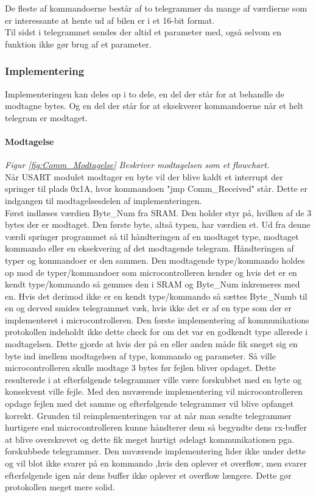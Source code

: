 De fleste af kommandoerne består af to telegrammer da mange af værdierne som er interessante at hente ud af bilen er i et 16-bit format.\\
Til sidst i telegrammet sendes der altid et parameter med, også selvom en funktion ikke gør brug af et parameter.

\subsubsection{Implementering}
Implementeringen kan deles op i to dele, en del der står for at behandle de modtagne bytes. Og en del der står for at eksekverer kommandoerne når et helt telegram er modtaget. 

\paragraph{Modtagelse}
\textit{Figur \ref{fig:Comm_Modtagelse} Beskriver modtagelsen som et flowchart.} \\

Når USART modulet modtager en byte vil der blive kaldt et interrupt der springer til plads 0x1A, hvor kommandoen "jmp Comm\_Received" står. Dette er indgangen til modtagelsesdelen af implementeringen. \\
Først indlæses værdien Byte\_Num fra SRAM. Den holder styr på, hvilken af de 3 bytes der er modtaget. Den første byte, altså typen, har værdien et. Ud fra denne værdi springer programmet så til håndteringen af en modtaget type, modtaget kommando eller en eksekvering af det modtagende telegram. Håndteringen af typer og kommandoer er den sammen. Den modtagende type/kommando holdes op mod de typer/kommandoer som microcontrolleren kender og hvis det er en kendt type/kommando så gemmes den i SRAM og Byte\_Num inkremeres med en. Hvis det derimod ikke er en kendt type/kommando så sættes Byte\_Numb til en og derved smides telegrammet væk, hvis ikke det er af en type som der er implementeret i microcontrolleren. Den første implementering af kommunikations protokollen indeholdt ikke dette check for om det var en godkendt type allerede i modtagelsen. Dette gjorde at hvis der på en eller anden måde fik sneget sig en byte ind imellem modtagelsen af type, kommando og parameter. Så ville microcontrolleren skulle modtage 3 bytes før fejlen bliver opdaget. Dette resulterede i at efterfølgende telegrammer ville være forskubbet med en byte og konsekvent ville fejle. Med den nuværende implementering vil microcontrolleren opdage fejlen med det samme og efterfølgende telegrammer vil blive opfanget korrekt. Grunden til reimplementeringen var at når man sendte telegrammer hurtigere end microcontrolleren kunne håndterer dem så begyndte dens rx-buffer at blive overskrevet og dette fik meget hurtigt ødelagt kommunikationen pga. forskubbede telegrammer. Den nuværende implementering lider ikke under dette og vil blot ikke svarer på en kommando ,hvis den oplever et overflow, men svarer efterfølgende igen når dens buffer ikke oplever et overflow længere. Dette gør protokollen meget mere solid.

